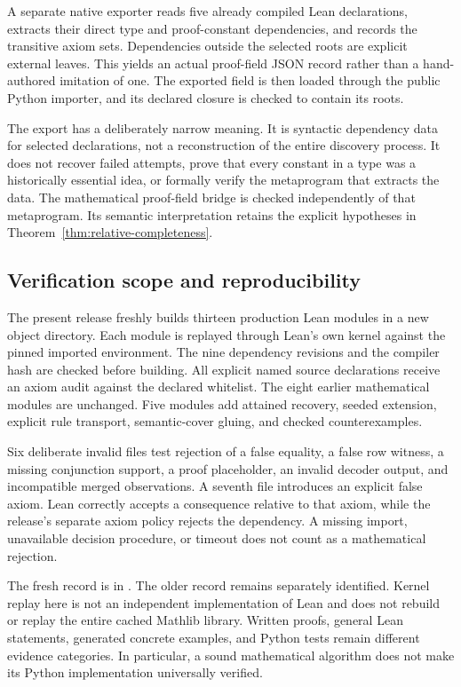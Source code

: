 \documentclass[11pt,oneside]{article}
\theoremstyle{komorebiplain}
\theoremstyle{komorebidefinition}
\theoremstyle{komorebiremark}
\begin{document}
A separate native exporter reads five already compiled Lean declarations, extracts their direct type and proof-constant dependencies, and records the transitive axiom sets. Dependencies outside the selected roots are explicit external leaves. This yields an actual proof-field JSON record rather than a hand-authored imitation of one. The exported field is then loaded through the public Python importer, and its declared closure is checked to contain its roots.

The export has a deliberately narrow meaning. It is syntactic dependency data for selected declarations, not a reconstruction of the entire discovery process. It does not recover failed attempts, prove that every constant in a type was a historically essential idea, or formally verify the metaprogram that extracts the data. The mathematical proof-field bridge is checked independently of that metaprogram. Its semantic interpretation retains the explicit hypotheses in Theorem~\ref{thm:relative-completeness}.

\subsection{Verification scope and reproducibility}

The present release freshly builds thirteen production Lean modules in a new object directory. Each module is replayed through Lean's own kernel against the pinned imported environment. The nine dependency revisions and the compiler hash are checked before building. All explicit named source declarations receive an axiom audit against the declared whitelist. The eight earlier mathematical modules are unchanged. Five modules add attained recovery, seeded extension, explicit rule transport, semantic-cover gluing, and checked counterexamples.

Six deliberate invalid files test rejection of a false equality, a false row witness, a missing conjunction support, a proof placeholder, an invalid decoder output, and incompatible merged observations. A seventh file introduces an explicit false axiom. Lean correctly accepts a consequence relative to that axiom, while the release's separate axiom policy rejects the dependency. A missing import, unavailable decision procedure, or timeout does not count as a mathematical rejection.

The fresh record is in . The older record remains separately identified. Kernel replay here is not an independent implementation of Lean and does not rebuild or replay the entire cached Mathlib library. Written proofs, general Lean statements, generated concrete examples, and Python tests remain different evidence categories. In particular, a sound mathematical algorithm does not make its Python implementation universally verified.
\end{document}
